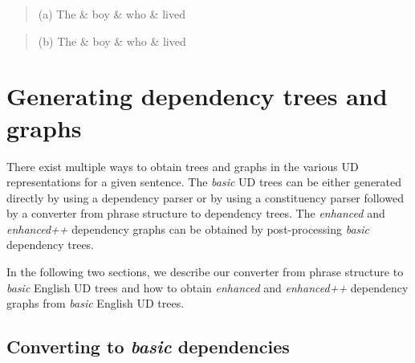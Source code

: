 \documentclass[10pt, a4paper]{article}
\begin{document}
\begin{quote}
\begin{center}
\begin{dependency}[column sep=0.2em, edge unit distance=2.25ex]
  \begin{deptext}
    (a) The \& boy \& who \& lived \\
  \end{deptext}
\end{dependency}
\end{center}
\end{quote}
 
\begin{quote}
\begin{center}
\begin{dependency}[column sep=0.2em, edge unit distance=2.25ex]
  \begin{deptext}
    (b) The \& boy \& who \& lived \\
  \end{deptext}
\end{dependency}
\end{center}
\end{quote}
 
 


 
 
\section{Generating dependency trees and graphs}

There exist multiple ways to obtain trees and graphs in the various UD representations for
a given sentence. The \textit{basic} UD trees can be either generated directly by using a dependency 
parser or by using a constituency parser followed by a converter from phrase structure to dependency
trees. The \textit{enhanced} and \textit{enhanced++} dependency graphs can be obtained by 
post-processing \textit{basic} dependency trees. 

In the following two sections, we describe our converter from phrase structure 
to \textit{basic} English UD trees and how to obtain \textit{enhanced} and \textit{enhanced++} 
dependency graphs from \textit{basic} English UD trees.

\subsection{Converting to \textit{basic} dependencies}
\end{document}
